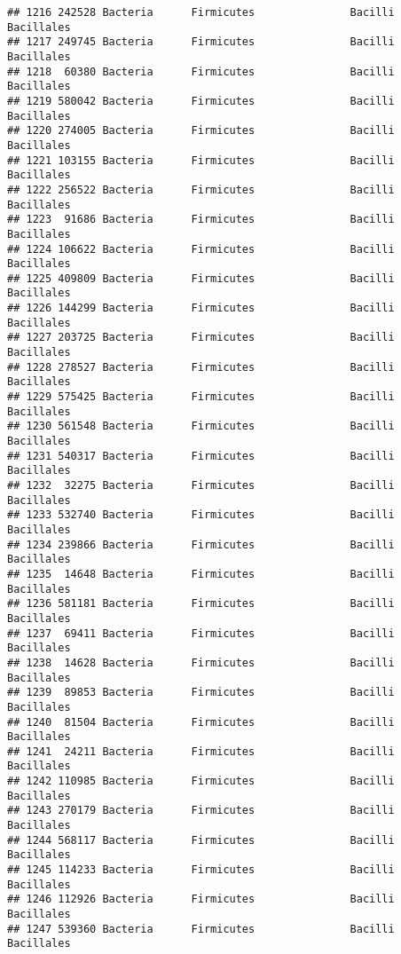 \documentclass[
]{article}
\begin{document}
\begin{verbatim}
## 1216 242528 Bacteria      Firmicutes               Bacilli          Bacillales
## 1217 249745 Bacteria      Firmicutes               Bacilli          Bacillales
## 1218  60380 Bacteria      Firmicutes               Bacilli          Bacillales
## 1219 580042 Bacteria      Firmicutes               Bacilli          Bacillales
## 1220 274005 Bacteria      Firmicutes               Bacilli          Bacillales
## 1221 103155 Bacteria      Firmicutes               Bacilli          Bacillales
## 1222 256522 Bacteria      Firmicutes               Bacilli          Bacillales
## 1223  91686 Bacteria      Firmicutes               Bacilli          Bacillales
## 1224 106622 Bacteria      Firmicutes               Bacilli          Bacillales
## 1225 409809 Bacteria      Firmicutes               Bacilli          Bacillales
## 1226 144299 Bacteria      Firmicutes               Bacilli          Bacillales
## 1227 203725 Bacteria      Firmicutes               Bacilli          Bacillales
## 1228 278527 Bacteria      Firmicutes               Bacilli          Bacillales
## 1229 575425 Bacteria      Firmicutes               Bacilli          Bacillales
## 1230 561548 Bacteria      Firmicutes               Bacilli          Bacillales
## 1231 540317 Bacteria      Firmicutes               Bacilli          Bacillales
## 1232  32275 Bacteria      Firmicutes               Bacilli          Bacillales
## 1233 532740 Bacteria      Firmicutes               Bacilli          Bacillales
## 1234 239866 Bacteria      Firmicutes               Bacilli          Bacillales
## 1235  14648 Bacteria      Firmicutes               Bacilli          Bacillales
## 1236 581181 Bacteria      Firmicutes               Bacilli          Bacillales
## 1237  69411 Bacteria      Firmicutes               Bacilli          Bacillales
## 1238  14628 Bacteria      Firmicutes               Bacilli          Bacillales
## 1239  89853 Bacteria      Firmicutes               Bacilli          Bacillales
## 1240  81504 Bacteria      Firmicutes               Bacilli          Bacillales
## 1241  24211 Bacteria      Firmicutes               Bacilli          Bacillales
## 1242 110985 Bacteria      Firmicutes               Bacilli          Bacillales
## 1243 270179 Bacteria      Firmicutes               Bacilli          Bacillales
## 1244 568117 Bacteria      Firmicutes               Bacilli          Bacillales
## 1245 114233 Bacteria      Firmicutes               Bacilli          Bacillales
## 1246 112926 Bacteria      Firmicutes               Bacilli          Bacillales
## 1247 539360 Bacteria      Firmicutes               Bacilli          Bacillales

\end{verbatim}
\end{document}
